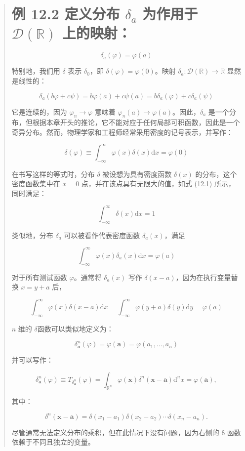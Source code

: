 \begin{quote}
\section{\texorpdfstring{例 12.2 定义分布 \(\delta_a\) 为作用于
\(\mathcal{D}(\mathbb{R})\)
上的映射：}{例 12.2 定义分布 \textbackslash delta\_a 为作用于 \textbackslash mathcal\{D\}(\textbackslash mathbb\{R\}) 上的映射：}}\label{ux4f8b-12.2-ux5b9aux4e49ux5206ux5e03-delta_a-ux4e3aux4f5cux7528ux4e8e-mathcaldmathbbr-ux4e0aux7684ux6620ux5c04}

\[
\delta_a(\varphi) = \varphi(a)
\]

特别地，我们用 \(\delta\) 表示 \(\delta_0\)，即
\(\delta(\varphi) = \varphi(0)\)。映射
\(\delta_a: \mathcal{D}(\mathbb{R}) \to \mathbb{R}\) 显然是线性的：

\[
\delta_a(b \varphi + c \psi) = b \varphi(a) + c \psi(a) = b \delta_a(\varphi) + c \delta_a(\psi)
\]

它是连续的，因为 \(\varphi_n \to \varphi\) 意味着
\(\varphi_n(a) \to \varphi(a)\)。因此，\(\delta_a\)
是一个分布，但根据本章开头的推论，它不能对应于任何局部可积函数，因此是一个奇异分布。然而，物理学家和工程师经常采用密度的记号表示，并写作：

\[
\delta(\varphi) \equiv \int_{-\infty}^\infty \varphi(x) \delta(x) \mathrm{d}x = \varphi(0)
\]

在书写这样的等式时，分布 \(\delta\) 被设想为具有密度函数 \(\delta(x)\)
的分布，这个密度函数集中在 \(x = 0\) 点，并在该点具有无限大的值，如式
(12.1) 所示，同时满足：

\[
\int_{-\infty}^\infty \delta(x) \mathrm{d}x = 1
\]

类似地，分布 \(\delta_a\) 可以被看作代表密度函数 \(\delta_a(x)\)，满足

\[
\int_{-\infty}^\infty \varphi(x) \delta_a(x) \mathrm{d}x = \varphi(a)
\]

对于所有测试函数 \(\varphi\)。通常将 \(\delta_a(x)\) 写作
\(\delta(x-a)\)，因为在执行变量替换 \(x = y + a\) 后，

\[
\int_{-\infty}^\infty \varphi(x) \delta(x-a) \mathrm{d}x = \int_{-\infty}^\infty \varphi(y+a) \delta(y) \mathrm{d}y = \varphi(a)
\]

\(n\) 维的 $\delta$函数可以类似地定义为：

\[
\delta_\mathbf{a}^n(\varphi) = \varphi(\mathbf{a}) = \varphi(a_1, \ldots, a_n)
\]

并可以写作：

\[
\delta_\mathbf{a}^n(\varphi) \equiv T_{\delta_\mathbf{a}^n}(\varphi) = \int_{\mathbb{R}^n} \varphi(\mathbf{x}) \delta^n(\mathbf{x} - \mathbf{a}) \mathrm{d}^n x = \varphi(\mathbf{a}),
\]

其中：

\[
\delta^n(\mathbf{x} - \mathbf{a}) = \delta(x_1 - a_1) \delta(x_2 - a_2) \cdots \delta(x_n - a_n).
\]

尽管通常无法定义分布的乘积，但在此情况下没有问题，因为右侧的 δ
函数依赖于不同且独立的变量。
\end{quote}

